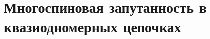 \chapter{Многоспиновая запутанность в квазиодномерных цепочках}
\label{chapter:manayparticle-entantlement-in-zigzag-chain}


%
%
%
%
%
%

